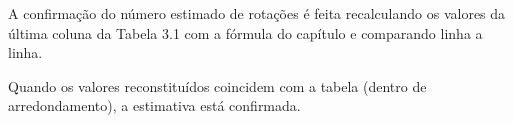 A confirmação do número estimado de rotações é feita recalculando os valores da última coluna da Tabela 3.1 com a fórmula do capítulo e comparando linha a linha.

Quando os valores reconstituídos coincidem com a tabela (dentro de arredondamento), a estimativa está confirmada.

